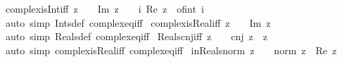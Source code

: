 \begin{isabellebody}
\isanewline
{}\isamarkupfalse%
\ complex{\isacharunderscore}{\kern0pt}is{\isacharunderscore}{\kern0pt}Int{\isacharunderscore}{\kern0pt}iff{\isacharcolon}{\kern0pt}\ {\isachardoublequoteopen}z\ {\isasymin}\ {\isasymint}\ {\isasymlongleftrightarrow}\ Im\ z\ {\isacharequal}{\kern0pt}\ {}\ {\isasymand}\ {\isacharparenleft}{\kern0pt}{\isasymexists}i{\isachardot}{\kern0pt}\ Re\ z\ {\isacharequal}{\kern0pt}\ of{\isacharunderscore}{\kern0pt}int\ i{\isacharparenright}{\kern0pt}{\isachardoublequoteclose}\isanewline
%
\isadelimproof
\ \ %
\endisadelimproof
%
\isatagproof
{}\isamarkupfalse%
\ {\isacharparenleft}{\kern0pt}auto\ simp{\isacharcolon}{\kern0pt}\ Ints{\isacharunderscore}{\kern0pt}def\ complex{\isacharunderscore}{\kern0pt}eq{\isacharunderscore}{\kern0pt}iff{\isacharparenright}{\kern0pt}%
\endisatagproof
{\isafoldproof}%
%
\isadelimproof
\isanewline
%
\endisadelimproof
\isanewline
{}\isamarkupfalse%
\ complex{\isacharunderscore}{\kern0pt}is{\isacharunderscore}{\kern0pt}Real{\isacharunderscore}{\kern0pt}iff{\isacharcolon}{\kern0pt}\ {\isachardoublequoteopen}z\ {\isasymin}\ {\isasymreal}\ {\isasymlongleftrightarrow}\ Im\ z\ {\isacharequal}{\kern0pt}\ {}{\isachardoublequoteclose}\isanewline
%
\isadelimproof
\ \ %
\endisadelimproof
%
\isatagproof
{}\isamarkupfalse%
\ {\isacharparenleft}{\kern0pt}auto\ simp{\isacharcolon}{\kern0pt}\ Reals{\isacharunderscore}{\kern0pt}def\ complex{\isacharunderscore}{\kern0pt}eq{\isacharunderscore}{\kern0pt}iff{\isacharparenright}{\kern0pt}%
\endisatagproof
{\isafoldproof}%
%
\isadelimproof
\isanewline
%
\endisadelimproof
\isanewline
{}\isamarkupfalse%
\ Reals{\isacharunderscore}{\kern0pt}cnj{\isacharunderscore}{\kern0pt}iff{\isacharcolon}{\kern0pt}\ {\isachardoublequoteopen}z\ {\isasymin}\ {\isasymreal}\ {\isasymlongleftrightarrow}\ cnj\ z\ {\isacharequal}{\kern0pt}\ z{\isachardoublequoteclose}\isanewline
%
\isadelimproof
\ \ %
\endisadelimproof
%
\isatagproof
{}\isamarkupfalse%
\ {\isacharparenleft}{\kern0pt}auto\ simp{\isacharcolon}{\kern0pt}\ complex{\isacharunderscore}{\kern0pt}is{\isacharunderscore}{\kern0pt}Real{\isacharunderscore}{\kern0pt}iff\ complex{\isacharunderscore}{\kern0pt}eq{\isacharunderscore}{\kern0pt}iff{\isacharparenright}{\kern0pt}%
\endisatagproof
{\isafoldproof}%
%
\isadelimproof
\isanewline
%
\endisadelimproof
\isanewline
{}\isamarkupfalse%
\ in{\isacharunderscore}{\kern0pt}Reals{\isacharunderscore}{\kern0pt}norm{\isacharcolon}{\kern0pt}\ {\isachardoublequoteopen}z\ {\isasymin}\ {\isasymreal}\ {\isasymLongrightarrow}\ norm\ z\ {\isacharequal}{\kern0pt}\ {\isasymbar}Re\ z{\isasymbar}{\isachardoublequoteclose}\isanewline

\end{isabellebody}
